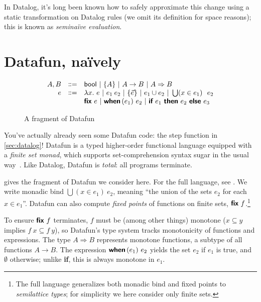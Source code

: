 \documentclass[sigplan,screen,review,timestamp,dvipsnames]{acmart}
\newcommand{\naive}{na\"ive}
\newcommand{\bnfeq}{\dblcolon=}
\newcommand{\bnfcont}{}
\newcommand{\pipe}{~|~}
\newcommand{\fn}{\lambda}
\newcommand{\binder}{.~}
\newcommand{\bind}[1]{#1\binder}
\newcommand{\fnof}[1]{\fn\bind{#1}}
\newcommand{\kw}[1]{\textsf{\bfseries #1}}
\newcommand{\tlv}[1]{\textsf{#1}}
\newcommand{\mto}{\overset{+}{\to}}
\renewcommand{\mto}{\Rightarrow}
\newcommand{\tset}[1]{\{#1\}}
\newcommand{\tbool}{\textsf{bool}}
\newcommand{\eset}[1]{\{#1\}}
\newcommand{\ewhen}[1]{\kw{when}\,(#1)~}
\newcommand{\eif}[2]{\kw{if}~#1~\kw{then}~#2~\kw{else}~}
\newcommand{\efor}[1]{\bigcup(#1)~}
\newcommand{\efix}{\kw{fix}~}
\begin{document}

In Datalog, it's long been known how to safely approximate this change using a
static transformation on Datalog rules (we omit its definition for space
reasons); this is known as \emph{semi\naive{} evaluation}.


\section{Datafun, na\"ively}

\begin{figure}
  \[
  \begin{array}{rcl}
    A,B &\bnfeq& \tbool \pipe \tset{A} \pipe A \to B \pipe A \mto B
    \\
    e &\bnfeq& \fnof{x} e \pipe e_1\:e_2 \pipe \eset{\vec{e}} \pipe e_1 \cup e_2
    \pipe \efor{x \in e_1}~ e_2
    \\ &\bnfcont&  \efix e \pipe \ewhen{e_1} e_2 \pipe \eif{e_1}{e_2}{e_3}
  \end{array}
  \]\vspace{-1em}
  \caption{A fragment of Datafun}
  \label{fig:datafun}
\end{figure}

You've actually already seen some Datafun code: the \tlv{step} function in
\cref{sec:datalog}! Datafun is a typed higher-order functional language equipped
with a \emph{finite set monad}, which supports set-comprehension syntax sugar in
the usual way~\cite{comprehending-monads}. Like Datalog, Datafun is
\emph{total}: all programs terminate.

 gives the fragment of Datafun we consider here. For the full
language, see \citet{datafun}. We write monadic bind $\efor{x \in e_1} e_2$,
meaning ``the union of the sets $e_2$ for each $x \in e_1$''.
%
Datafun can also compute \emph{fixed points} of functions on finite sets, $\efix
f$.\footnote{The full language generalizes both monadic bind and fixed points to
  \emph{semilattice types}; for simplicity we here consider only finite sets.}

To ensure $\efix f$ terminates, $f$ must be (among other things) monotone ($x
\subseteq y$ implies $f\:x \subseteq f\:y$), so Datafun's type system tracks
monotonicity of functions and expressions.
%
The type $A \mto B$ represents monotone functions, a subtype of all functions $A
\to B$. The expression $\ewhen{e_1}{e_2}$ yields the set $e_2$ if $e_1$ is true,
and $\emptyset$ otherwise; unlike \kw{if}, this is always monotone in $e_1$.
\end{document}
